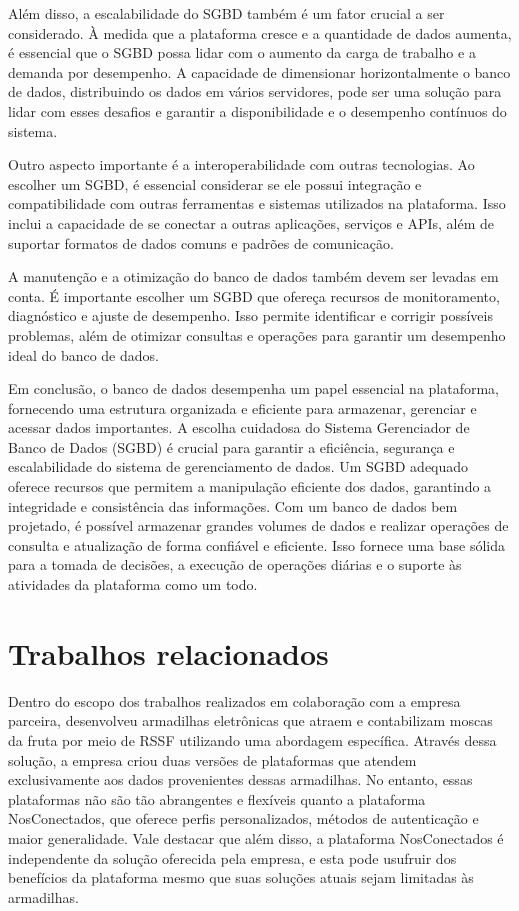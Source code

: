 \documentclass[tcc,capa]{texufpel}
\begin{document}
Além disso, a escalabilidade do SGBD também é um fator crucial a ser considerado. À medida que a plataforma cresce e a quantidade de dados aumenta, é essencial que o SGBD possa lidar com o aumento da carga de trabalho e a demanda por desempenho. A capacidade de dimensionar horizontalmente o banco de dados, distribuindo os dados em vários servidores, pode ser uma solução para lidar com esses desafios e garantir a disponibilidade e o desempenho contínuos do sistema.

Outro aspecto importante é a interoperabilidade com outras tecnologias. Ao escolher um SGBD, é essencial considerar se ele possui integração e compatibilidade com outras ferramentas e sistemas utilizados na plataforma. Isso inclui a capacidade de se conectar a outras aplicações, serviços e APIs, além de suportar formatos de dados comuns e padrões de comunicação.

A manutenção e a otimização do banco de dados também devem ser levadas em conta. É importante escolher um SGBD que ofereça recursos de monitoramento, diagnóstico e ajuste de desempenho. Isso permite identificar e corrigir possíveis problemas, além de otimizar consultas e operações para garantir um desempenho ideal do banco de dados.

Em conclusão, o banco de dados desempenha um papel essencial na plataforma, fornecendo uma estrutura organizada e eficiente para armazenar, gerenciar e acessar dados importantes. A escolha cuidadosa do Sistema Gerenciador de Banco de Dados (SGBD) é crucial para garantir a eficiência, segurança e escalabilidade do sistema de gerenciamento de dados. Um SGBD adequado oferece recursos que permitem a manipulação eficiente dos dados, garantindo a integridade e consistência das informações. Com um banco de dados bem projetado, é possível armazenar grandes volumes de dados e realizar operações de consulta e atualização de forma confiável e eficiente. Isso fornece uma base sólida para a tomada de decisões, a execução de operações diárias e o suporte às atividades da plataforma como um todo.
\chapter{Trabalhos relacionados}
Dentro do escopo dos trabalhos realizados em colaboração com a empresa parceira, \citet{zanini2021modelagem} desenvolveu armadilhas eletrônicas que atraem e contabilizam moscas da fruta por meio de RSSF utilizando uma abordagem específica. Através dessa solução, a empresa criou duas versões de plataformas que atendem exclusivamente aos dados provenientes dessas armadilhas. No entanto, essas plataformas não são tão abrangentes e flexíveis quanto a plataforma NosConectados, que oferece perfis personalizados, métodos de autenticação e maior generalidade. Vale destacar que além disso, a plataforma NosConectados é independente da solução oferecida pela empresa, e esta pode usufruir dos benefícios da plataforma mesmo que suas soluções atuais sejam limitadas às armadilhas.
\end{document}
